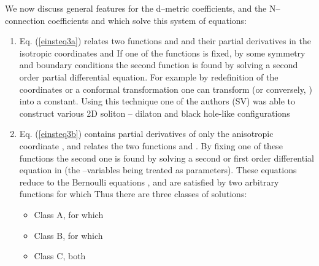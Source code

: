 \documentclass[a4paper,preprint,prabib,aps]{revtex4}
\begin{document}
We now discuss general features for the d--metric coefficients, \coordHE{} and the N--connection coefficients
\coordHE{} and \coordHE{} which solve this system of equations:

\begin{enumerate}
\item  Eq. (\ref{einsteq3a}) relates two functions \coordHE{} and \coordHE{} and their partial derivatives in the isotropic coordinates \coordHE{} and \coordHE{} If one of the functions is fixed, by some symmetry and boundary
conditions the second function is found by solving a second order partial
differential equation. For example by redefinition of the coordinates or a
conformal transformation one can transform \coordHE{} (or conversely, \coordHE{})
into a constant. Using this technique one of the authors (SV) was able to
construct various 2D soliton -- dilaton and black hole-like configurations
\cite{v}

\item  Eq. (\ref{einsteq3b}) contains partial derivatives of only the
anisotropic coordinate \coordHE{}, and relates the two functions \coordHE{}
and \coordHE{}. By fixing one of these functions the second one is
found by solving a second or first order differential equation in \coordHE{} (the \coordHE{}--variables being treated as parameters). These equations reduce to the
Bernoulli equations \cite{kamke}, and are satisfied by two arbitrary
functions \coordHE{} for which \coordHE{} Thus there are three
classes of solutions:

\begin{itemize}
\item  Class A, for which \coordHE{}  \coordHE{}

\item  Class B, for which \coordHE{}  \coordHE{}

\item  Class C, both \coordHE{}
\end{itemize}


\end{enumerate}
\end{document}
